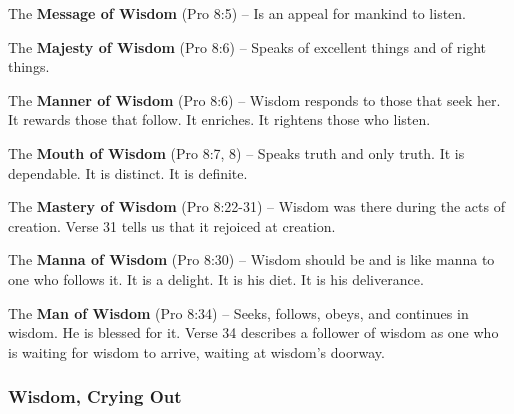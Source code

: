 \begin{compactenum}[I.][7]
    \item The \textbf{Message of Wisdom}  (Pro 8:5) -- Is an appeal for mankind to listen.
    \item The \textbf{Majesty of Wisdom}  (Pro 8:6) -- Speaks of excellent things and of right things.
    \item The \textbf{Manner of Wisdom}  (Pro 8:6) -- Wisdom responds to those that seek her.  It rewards those that follow. It enriches.  It rightens those who listen.
    \item The \textbf{Mouth of Wisdom}  (Pro 8:7, 8) -- Speaks truth and only truth.  It is dependable.  It is distinct. It is definite.
    \item The \textbf{Mastery of Wisdom}  (Pro 8:22-31) -- Wisdom was there during the acts of creation. Verse 31 tells us that it rejoiced at creation. 
    \item The \textbf{Manna of Wisdom}  (Pro 8:30) -- Wisdom should be and is like manna to one who follows it.  It is a delight.  It is his diet.  It is his deliverance. 
    \item The \textbf{Man of Wisdom}  (Pro 8:34) -- Seeks, follows, obeys, and continues in wisdom. He is blessed for it. Verse 34 describes a follower of wisdom as one who is waiting for wisdom to arrive, waiting at wisdom's doorway.
\end{compactenum}

\subsubsection{Wisdom, Crying Out}

